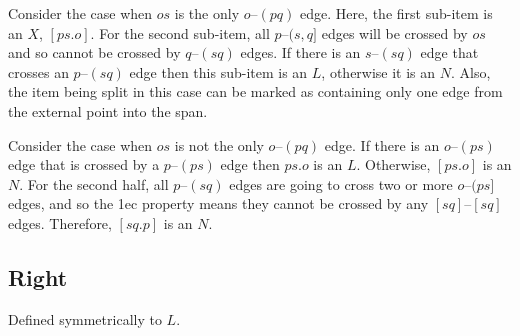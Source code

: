 Consider the case when $os$ is the only $o$--$(pq)$ edge.
Here, the first sub-item is an $X$, $[ps.o]$.
For the second sub-item, all $p$--$(s, q]$ edges will be crossed by $os$ and so cannot be crossed by $q$--$(sq)$ edges.
If there is an $s$--$(sq)$ edge that crosses an $p$--$(sq)$ edge then this sub-item is an $L$, otherwise it is an $N$.
Also, the item being split in this case can be marked as containing only one edge from the external point into the span.


\begin{center}
\end{center}

Consider the case when $os$ is not the only $o$--$(pq)$ edge.
If there is an $o$--$(ps)$ edge that is crossed by a $p$--$(ps)$ edge then $ps.o$ is an $L$.
Otherwise, $[ps.o]$ is an $N$.
For the second half, all $p$--$(sq)$ edges are going to cross two or more $o$--$(ps]$ edges, and so the 1ec property means they cannot be crossed by any $[sq]$--$[sq]$ edges.
Therefore, $[sq.p]$ is an $N$.


\subsection{Right}
Defined symmetrically to $L$.

